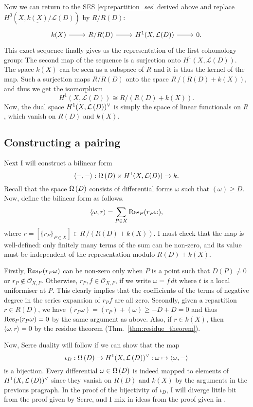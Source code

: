 Now we can return to the SES \eqref{eq:repartition_ses} derived above and
replace $H^{0}(X,\underline{k(X)}/\mathcal{L}(D))$ by $R/R(D)$:
\[
  \begin{tikzcd}
    k(X)\rar & R/R(D)\rar & H^{1}(X,\mathcal{L}(D))\rar & 0.
  \end{tikzcd}
\]
This exact sequence finally gives us the representation of the first
cohomology group: The second map of the sequence is a surjection
onto $H^{1}(X,\mathcal{L}(D))$. The space $k(X)$ can be seen as a subspace
of $R$ and it is thus the kernel of the map. Such a surjection maps $R/R(D)$
onto the space $R\,/\left(R(D)+k(X)\right)$, and thus we get the isomorphism
\[H^{1}(X,\mathcal{L}(D))\cong R/\left(R(D)+k(X)\right).\]
Now, the dual space $H^1(X,\mathcal{L}\left(D\right))^{\vee}$ is simply the space
of linear functionals on $R$, which vanish on $R(D)$ and $k(X)$.

\subsection{Constructing a pairing}
Next I will construct a bilinear form
\[
  \langle -,-\rangle:\Omega\left(D\right)\times H^{1}(X,\mathcal{L}(D))\to k.
\]
Recall that the space $\Omega\left(D\right)$ consists of differential forms $\omega$
such that $(\omega)\geq D$. Now, define the bilinear form as follows.
\[
  \langle\omega,r\rangle=\sum_{P\in X}\operatorname{Res}_{P}(r_{P}\omega),
\]
where $r=[\{r_{P}\}_{P\in X}]\in R\,/\left(R(D)+k(X)\right)$. I must check
that the map is well-defined: only finitely many terms of the sum can be
non-zero, and its value must be independent of the representation modulo
$R(D)+k(X)$.

Firstly, $\operatorname{Res}_{P}(r_{P}\omega)$ can be non-zero only when $P$ is a point
such that $D(P)\neq 0$ or $r_{P}\not\in\mathscr{O}_{X,P}$. Otherwise,
$r_{P},f\in\mathscr{O}_{X,P}$, if we write $\omega=f\,dt$ where $t$ is a
local uniformiser at $P$. This clearly implies that the coefficients of the
terms of negative degree in the series expansion of $r_{P}f$ are all zero.
Secondly, given a repartition $r\in R(D)$, we have $(r_{P}\omega)
=(r_{P})+(\omega) \geq -D+D=0$ and thus $\operatorname{Res}_{P}(r_{P}\omega)=0$ by the same
argument as above. Also, if $r\in k(X)$, then $\langle \omega,r\rangle=0$ by
the residue theorem (Thm.~\ref{thm:residue_theorem}).

Now, Serre duality will follow if we can show that the map
\[
  \iota_{D}:\Omega\left(D\right)\to H^1(X,\mathcal{L}\left(D\right))^{\vee}
  :\omega\mapsto\langle\omega,-\rangle
\]
is a bijection. Every differential $\omega\in\Omega\left(D\right)$ is indeed mapped
to elements of $H^1(X,\mathcal{L}\left(D\right))^{\vee}$ since they vanish on $R(D)$ and $k(X)$ by the
arguments in the previous pragraph. In the proof of the bijectivity of
$\iota_{D}$, I will diverge little bit from the proof given by Serre, and
I mix in ideas from the proof given in \cite{forster}.

